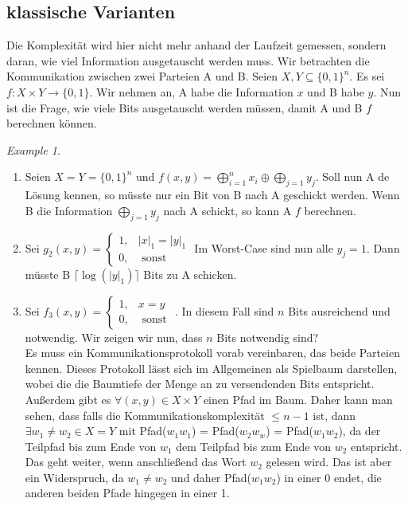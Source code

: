 \documentclass[a4paper, 12pt]{article}
\theoremstyle{plain}
\theoremstyle{definition}
\theoremstyle{lemma}
\theoremstyle{remark}
\theoremstyle{example}
\newtheorem{example}[theorem]{Example}
\begin{document}
	\subsection{klassische Varianten}
	Die Komplexität wird hier nicht mehr anhand der Laufzeit gemessen, sondern daran, wie viel Information ausgetauscht werden muss. Wir betrachten die Kommunikation zwischen zwei Parteien A und B. Seien $X,Y \subseteq \{0,1\}^n$. Es sei $f:X\times Y \to \{0,1\}$. Wir nehmen an, A habe die Information $x$ und B habe $y$. Nun ist die Frage, wie viele Bits ausgetauscht werden müssen, damit A und B $f$ berechnen können.
	\begin{example}
		\begin{enumerate}
			\item Seien $X=Y=\{0,1\}^n$ und $f(x,y) = \bigoplus_{i=1}^n x_i \oplus \bigoplus_{j=1} y_j$. Soll nun A de Lösung kennen, so müsste nur ein Bit von B nach A geschickt werden. Wenn B die Information $\bigoplus_{j=1} y_j$ nach A schickt, so kann A $f$ berechnen.
			\item Sei $g_2(x,y) = \begin{cases}
				1, & \left|x\right|_1 = \left|y\right|_1\\
				0, & \text{ sonst}
			\end{cases}$ Im Worst-Case sind nun alle $y_j = 1$. Dann müsste B $\lceil\log(\left|y\right|_1)\rceil$ Bits zu A schicken.
			\item Sei $f_3(x,y) = \begin{cases}
				1, & x=y\\
				0, & \text{ sonst }
			\end{cases}$. In diesem Fall sind $n$ Bits ausreichend und notwendig.
			Wir zeigen wir nun, dass $n$ Bits notwendig sind?\\
			Es muss ein Kommunikationsprotokoll vorab vereinbaren, das beide Parteien kennen. Dieses Protokoll lässt sich im Allgemeinen als Spielbaum darstellen, wobei die die Baumtiefe der Menge an zu versendenden Bits entspricht. Außerdem gibt es $\forall (x,y) \in X\times Y$ einen Pfad im Baum. Daher kann man sehen, dass falls die Kommunikationskomplexität $\leq n-1$ ist, dann $\exists w_1\neq w_2 \in X=Y$ mit Pfad($w_1w_1$) = Pfad($w_2w_w$) = Pfad($w_1w_2$), da der Teilpfad bis zum Ende von $w_1$ dem Teilpfad bis zum Ende von $w_2$ entspricht. Das geht weiter, wenn anschließend das Wort $w_2$ gelesen wird. Das ist aber ein Widerspruch, da $w_1\neq w_2$ und daher Pfad($w_1w_2$) in einer 0 endet, die anderen beiden Pfade hingegen in einer 1.
		\end{enumerate}
	\end{example}
\end{document}
